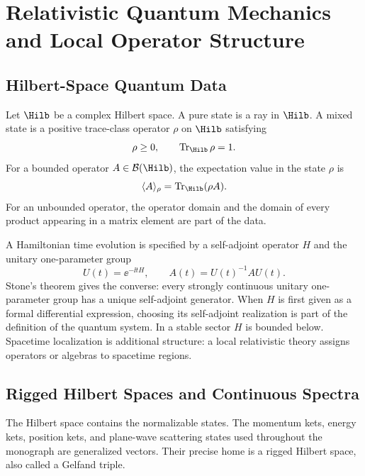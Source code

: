 \chapter{Relativistic Quantum Mechanics and Local Operator Structure}
\label{ch:relativistic-qm-local-operator-structure}
\ConventionsLorentzian


\section{Hilbert-Space Quantum Data}

\begin{definition}
\label{def:hilbert-space-quantum-datum}
Let \(\Hilb\) be a complex Hilbert space. A pure state is a ray in \(\Hilb\).
A mixed state is a positive trace-class operator \(\rho\) on \(\Hilb\)
satisfying
\[
  \rho\ge0,
  \qquad
  \operatorname{Tr}_{\Hilb}\rho=1.
\]
For a bounded operator \(A\in\mathcal B(\Hilb)\), the expectation value in
the state \(\rho\) is
\[
  \langle A\rangle_\rho=\operatorname{Tr}_{\Hilb}(\rho A).
\]
For an unbounded operator, the operator domain and the domain of every product
appearing in a matrix element are part of the data.
\end{definition}

\begin{definition}
\label{def:hamiltonian-time-evolution}
A Hamiltonian time evolution is specified by a self-adjoint operator \(H\) and
the unitary one-parameter group
\[
  U(t)=\ee^{-\ii tH},
  \qquad
  A(t)=U(t)^{-1}AU(t).
\]
Stone's theorem gives the converse: every strongly continuous unitary
one-parameter group has a unique self-adjoint generator.  When \(H\) is first
given as a formal differential expression, choosing its self-adjoint
realization is part of the definition of the quantum system.
In a stable sector \(H\) is bounded below. Spacetime localization is additional
structure: a local relativistic theory assigns operators or algebras to
spacetime regions.
\end{definition}

\section{Rigged Hilbert Spaces and Continuous Spectra}
\label{sec:rigged-hilbert-continuous-spectrum}

The Hilbert space contains the normalizable states. The momentum kets, energy
kets, position kets, and plane-wave scattering states used throughout the
monograph are generalized vectors. Their precise home is a rigged Hilbert
space, also called a Gelfand triple.

